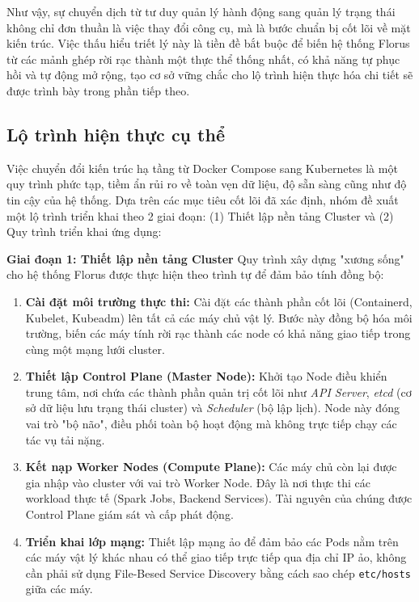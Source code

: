 Như vậy, sự chuyển dịch từ tư duy quản lý hành động sang quản lý trạng thái không chỉ đơn thuần là việc thay đổi công cụ, mà là bước chuẩn bị cốt lõi về mặt kiến trúc. Việc thấu hiểu triết lý này là tiền đề bắt buộc để biến hệ thống Florus từ các mảnh ghép rời rạc thành một thực thể thống nhất, có khả năng tự phục hồi và tự động mở rộng, tạo cơ sở vững chắc cho lộ trình hiện thực hóa chi tiết sẽ được trình bày trong phần tiếp theo.

\subsection{Lộ trình hiện thực cụ thể}

Việc chuyển đổi kiến trúc hạ tầng từ Docker Compose sang Kubernetes là một quy trình phức tạp, tiềm ẩn rủi ro về toàn vẹn dữ liệu, độ sẵn sàng cũng như độ tin cậy của hệ thống. Dựa trên các mục tiêu cốt lõi đã xác định, nhóm đề xuất một lộ trình triển khai theo 2 giai đoạn: (1) Thiết lập nền tảng Cluster và (2) Quy trình triển khai ứng dụng:
\newline

\textbf{Giai đoạn 1: Thiết lập nền tảng Cluster} 
\newline
\indent
Quy trình xây dựng "xương sống" cho hệ thống Florus được thực hiện theo trình tự để đảm bảo tính đồng bộ:

\begin{enumerate} 
    \item \textbf{Cài đặt môi trường thực thi:} Cài đặt các thành phần cốt lõi (Containerd, Kubelet, Kubeadm) lên tất cả các máy chủ vật lý. Bước này đồng bộ hóa môi trường, biến các máy tính rời rạc thành các node có khả năng giao tiếp trong cùng một mạng lưới cluster.
    \item \textbf{Thiết lập Control Plane (Master Node):}
    Khởi tạo Node điều khiển trung tâm, nơi chứa các thành phần quản trị cốt lõi như \textit{API Server}, \textit{etcd} (cơ sở dữ liệu lưu trạng thái cluster) và \textit{Scheduler} (bộ lập lịch). Node này đóng vai trò "bộ não", điều phối toàn bộ hoạt động mà không trực tiếp chạy các tác vụ tải nặng.

    \item \textbf{Kết nạp Worker Nodes (Compute Plane):} Các máy chủ còn lại được gia nhập vào cluster với vai trò Worker Node. Đây là nơi thực thi các workload thực tế (Spark Jobs, Backend Services). Tài nguyên của chúng được Control Plane giám sát và cấp phát động.

    \item \textbf{Triển khai lớp mạng:} Thiết lập mạng ảo để đảm bảo các Pods nằm trên các máy vật lý khác nhau có thể giao tiếp trực tiếp qua địa chỉ IP ảo, không cần phải sử dụng File-Besed Service Discovery bằng cách sao chép \texttt{etc/hosts} giữa các máy.
\end{enumerate}

